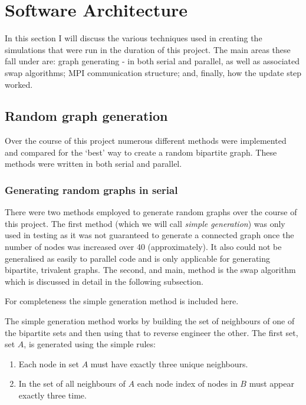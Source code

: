 \documentclass[pdftex,12pt,a4paper]{article}
\begin{document}
\section{Software Architecture}

In this section I will discuss the various techniques used in creating the simulations that were run in the duration of this project. The main areas these fall under are: graph generating - in both serial and parallel, as well as associated swap algorithms; MPI communication structure; and, finally, how the update step worked.

\subsection{Random graph generation}

Over the course of this project numerous different methods were implemented and compared for the `best' way to create a random bipartite graph. These methods were written in both serial and parallel.

\subsubsection{Generating random graphs in serial}

There were two methods employed to generate random graphs over the course of this project. The first method (which we will call \emph{simple generation}) was only used in testing as it was not guaranteed to generate a connected graph once the number of nodes was increased over 40 (approximately). It also could not be generalised as easily to parallel code and is only applicable for generating bipartite, trivalent graphs. The second, and main, method is the swap algorithm which is discussed in detail in the following subsection.

For completeness the simple generation method is included here.

The simple generation method works by building the set of neighbours of one of the bipartite sets and then using that to reverse engineer the other. The first set, set $A$, is generated using the simple rules:

\begin{enumerate}
\item Each node in set $A$ must have exactly three unique neighbours.
\item In the set of all neighbours of $A$ each node index of nodes in $B$ must appear exactly three time.
\end{enumerate}
\end{document}
